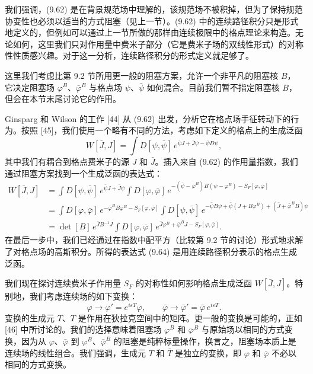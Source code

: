 我们强调，(9.62) 是在背景规范场中理解的，该规范场不被积掉，但为了保持规范协变性也必须以适当的方式阻塞（见上一节）。(9.62) 中的连续路径积分只是形式地定义的，但例如可以通过上一节所做的那样由连续极限中的格点理论来构造。无论如何，这里我们只对作用量中费米子部分（它是费米子场的双线性形式）的对称性性质感兴趣。对于这一分析，连续路径积分的形式定义就足够了。

这里我们考虑比第 9.2 节所用更一般的阻塞方案，允许一个非平凡的阻塞核 $B$，它决定阻塞场 $\varphi^B$、$\bar\varphi^B$ 与格点场 $\psi$、$\bar\psi$ 如何混合。目前我们暂不指定阻塞核 $B$，但会在本节末尾讨论它的作用。

Ginsparg 和 Wilson 的工作 [44] 从 (9.62) 出发，分析它在格点场手征转动下的行为。按照 [45]，我们使用一个略有不同的方法，考虑如下定义的格点上的生成泛函
\begin{equation}
  W[\bar J,J] = \int D[\psi,\bar\psi]\,e^{\bar\psi J + \bar J\psi - \bar\psi D\psi} ,
\end{equation}
其中我们有耦合到格点费米子的源 $J$ 和 $\bar J$。插入来自 (9.62) 的作用量指数，我们通过阻塞方案找到一个生成泛函的表达式：
\begin{align}
  W[\bar J,J] &= \int D[\psi,\bar\psi]\,e^{\bar\psi J + \bar J\psi}
    \int D[\varphi,\bar\varphi]\,
    e^{-(\bar\psi-\bar\varphi^B)B(\psi-\varphi^B) - S_F[\varphi,\bar\varphi]} \nonumber\\
  &= \int D[\varphi,\bar\varphi]\,e^{-\bar\varphi^B B\varphi^B - S_F[\varphi,\bar\varphi]}
    \int D[\psi,\bar\psi]\,
    e^{-\bar\psi B\psi + \bar\psi(J+B\varphi^B) + (\bar J+\bar\varphi^B B)\psi} \nonumber\\
  &= \det[B]\,e^{\bar J B^{-1} J}\int D[\varphi,\bar\varphi]\,
    e^{\bar J\varphi^B + \bar\varphi^B J - S_F[\varphi,\bar\varphi]} .
\end{align}
在最后一步中，我们已经通过在指数中配平方（比较第 9.2 节的讨论）形式地求解了对格点场的高斯积分。所得的表达式 (9.64) 是用连续路径积分表示的格点生成泛函。

我们现在探讨连续费米子作用量 $S_F$ 的对称性如何影响格点生成泛函 $W[\bar J,J]$。特别地，我们考虑连续场的如下变换：
\begin{equation}
  \varphi \to \varphi' = e^{i\varepsilon T}\varphi , \qquad
  \bar\varphi \to \bar\varphi' = \bar\varphi\,e^{i\varepsilon T} .
\end{equation}
变换的生成元 $T$、$T$ 是作用在狄拉克空间中的矩阵。更一般的变换是可能的，正如 [46] 中所讨论的。我们的选择意味着阻塞场 $\varphi^B$ 和 $\bar\varphi^B$ 与原始场以相同的方式变换，因为从 $\varphi$、$\bar\varphi$ 到 $\varphi^B$、$\bar\varphi^B$ 的阻塞是纯粹标量操作，换言之，阻塞场本质上是连续场的线性组合。我们强调，生成元 $T$ 和 $\bar T$ 是独立的变换，即 $\varphi$ 和 $\bar\varphi$ 不必以相同的方式变换。

